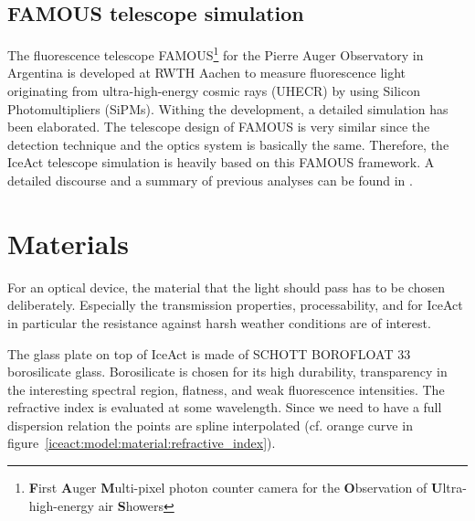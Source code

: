 \subsection{FAMOUS telescope simulation}\label{sec:famous_simulation}
The fluorescence telescope FAMOUS\footnote{\textbf{F}irst \textbf{A}uger \textbf{M}ulti-pixel
photon counter camera for the \textbf{O}bservation of \textbf{U}ltra-high-energy air \textbf{S}howers} for the Pierre Auger Observatory in Argentina is developed at RWTH Aachen to measure fluorescence light originating from ultra-high-energy cosmic rays (UHECR) by using Silicon Photomultipliers (SiPMs). Withing the development, a detailed \geant simulation has been elaborated. \cite{famous:sim_github,famous:sim_github} The telescope design of FAMOUS is very similar since the detection technique and the optics system is basically the same. Therefore, the IceAct telescope simulation is heavily based on this FAMOUS \geant framework. A detailed discourse and a summary of previous analyses can be found in \cite{famous:niggemann}.

\section{Materials}\label{sec:iceact:model:material}

For an optical device, the material that the light should pass has to be chosen deliberately. Especially the transmission properties, processability, and for IceAct in particular the resistance against harsh weather conditions are of interest.

The glass plate on top of IceAct is made of SCHOTT BOROFLOAT\textsuperscript{\textregistered} 33 borosilicate glass. Borosilicate is chosen for its high durability, transparency in the interesting spectral region, flatness, and weak fluorescence intensities. The refractive index is evaluated at some wavelength. Since we need to have a full dispersion relation the points are spline interpolated (cf. orange curve in figure~\ref{iceact:model:material:refractive_index}).~\cite{iceact:borosilicate:datasheet}

